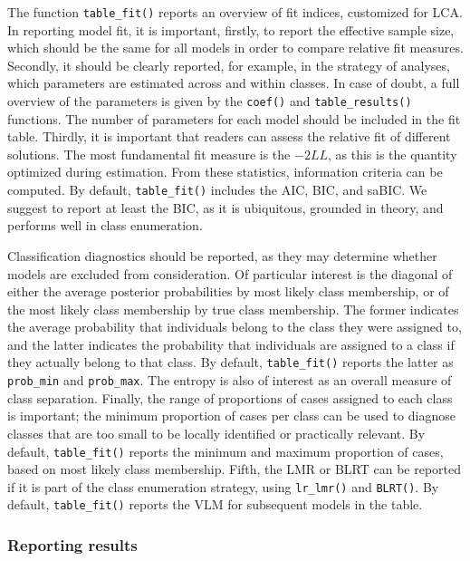 \documentclass[
  ,man,floatsintext]{apa6}
\begin{document}
The function \texttt{table\_fit()} reports an overview of fit indices, customized for LCA.
In reporting model fit, it is important, firstly, to report the effective sample size, which should be the same for all models in order to compare relative fit measures.
Secondly, it should be clearly reported,
for example, in the strategy of analyses,
which parameters are estimated across and within classes.
In case of doubt, a full overview of the parameters is given by the \texttt{coef()} and \texttt{table\_results()} functions.
The number of parameters for each model should be included in the fit table.
Thirdly, it is important that readers can assess the relative fit of different solutions.
The most fundamental fit measure is the \(-2LL\),
as this is the quantity optimized during estimation.
From these statistics, information criteria can be computed.
By default, \texttt{table\_fit()} includes the AIC, BIC, and saBIC.
We suggest to report at least the BIC, as it is ubiquitous, grounded in theory, and performs well in class enumeration.

Classification diagnostics should be reported,
as they may determine whether models are excluded from consideration.
Of particular interest is the diagonal of either the average posterior probabilities by most likely class membership,
or of the most likely class membership by true class membership.
The former indicates the average probability that individuals belong to the class they were assigned to,
and the latter indicates the probability that individuals are assigned to a class if they actually belong to that class.
By default, \texttt{table\_fit()} reports the latter as \texttt{prob\_min} and \texttt{prob\_max}.
The entropy is also of interest as an overall measure of class separation.
Finally, the range of proportions of cases assigned to each class is important;
the minimum proportion of cases per class can be used to diagnose classes that are too small to be locally identified or practically relevant.
By default, \texttt{table\_fit()} reports the minimum and maximum proportion of cases,
based on most likely class membership.
Fifth, the LMR or BLRT can be reported if it is part of the class enumeration strategy, using \texttt{lr\_lmr()} and \texttt{BLRT()}.
By default, \texttt{table\_fit()} reports the VLM for subsequent models in the table.

\hypertarget{reporting-results}{%
\subsubsection{Reporting results}\label{reporting-results}}
\end{document}

